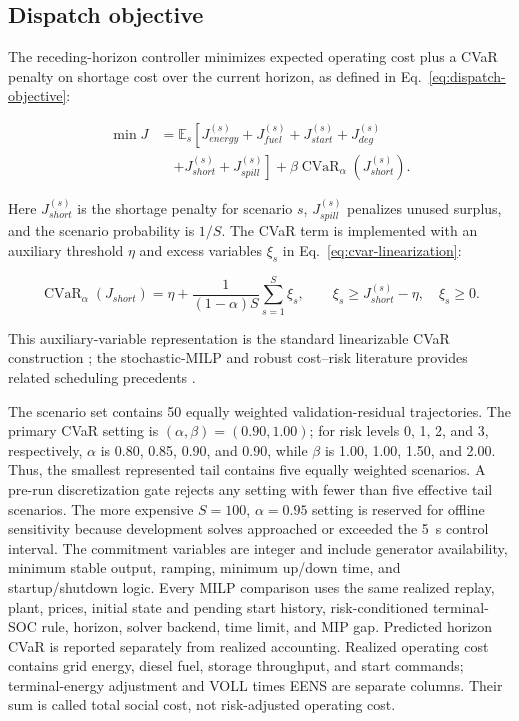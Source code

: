 \subsection{Dispatch objective}\label{dispatch-objective}

The receding-horizon controller minimizes expected operating cost plus a
CVaR penalty on shortage cost over the current horizon, as defined in
Eq.~\eqref{eq:dispatch-objective}:

\begin{equation}
\label{eq:dispatch-objective}
\begin{aligned}
\min J &= \mathbb E_s\left[J_{energy}^{(s)}+J_{fuel}^{(s)}+J_{start}^{(s)}+J_{deg}^{(s)}\right.\\
&\quad\left.+J_{short}^{(s)}+J_{spill}^{(s)}\right]
+\beta\operatorname{CVaR}_{\alpha}\left(J_{short}^{(s)}\right).
\end{aligned}
\end{equation}

Here $J_{short}^{(s)}$ is the shortage penalty for scenario $s$,
$J_{spill}^{(s)}$ penalizes unused surplus, and the scenario probability is
$1/S$. The CVaR term is implemented with an auxiliary threshold $\eta$ and
excess variables $\xi_s$ in Eq.~\eqref{eq:cvar-linearization}:

\begin{equation}
\label{eq:cvar-linearization}
\operatorname{CVaR}_{\alpha}(J_{short})=\eta+\frac{1}{(1-\alpha)S}\sum_{s=1}^{S}\xi_s,
\qquad \xi_s\geq J_{short}^{(s)}-\eta,\quad \xi_s\geq0.
\end{equation}

This auxiliary-variable representation is the standard linearizable CVaR
construction \citep{rockafellar2000cvar}; the stochastic-MILP and robust
cost--risk literature provides related scheduling precedents
\citep{franke2020stochasticmilp,ji2018robustcvar}.

The scenario set contains 50 equally weighted validation-residual trajectories.
The primary CVaR setting is $(\alpha,\beta)=(0.90,1.00)$; for risk levels 0,
1, 2, and 3, respectively, $\alpha$ is 0.80, 0.85, 0.90, and 0.90, while
$\beta$ is 1.00, 1.00, 1.50, and 2.00. Thus, the smallest represented tail
contains five equally weighted scenarios. A pre-run discretization gate rejects
any setting with fewer than five effective tail scenarios. The more expensive
$S=100$, $\alpha=0.95$ setting is reserved for offline sensitivity because
development solves approached or exceeded the 5~s control interval.
The commitment variables are integer and include generator availability,
minimum stable output, ramping, minimum up/down time, and startup/shutdown
logic. Every MILP comparison uses the same realized replay, plant, prices,
initial state and pending start history, risk-conditioned terminal-SOC rule,
horizon, solver backend, time limit, and MIP gap. Predicted horizon CVaR is
reported separately from realized accounting. Realized operating cost contains
grid energy, diesel fuel, storage throughput, and start commands;
terminal-energy adjustment and VOLL times EENS are separate columns. Their sum
is called total social cost, not risk-adjusted operating cost.

